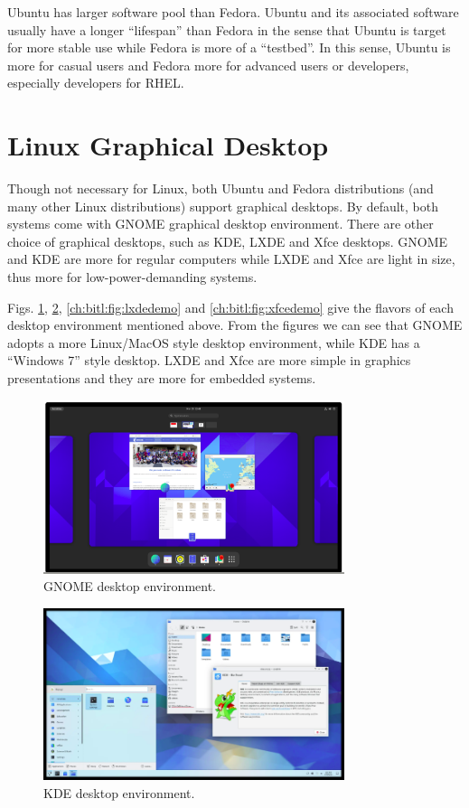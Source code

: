 Ubuntu has larger software pool than Fedora. Ubuntu and its associated software usually have a longer ``lifespan'' than Fedora in the sense that Ubuntu is target for more stable use while Fedora is more of a ``testbed''. In this sense, Ubuntu is more for casual users and Fedora more for advanced users or developers, especially developers for RHEL.

\section{Linux Graphical Desktop}

Though not necessary for Linux, both Ubuntu and Fedora distributions (and many other Linux distributions) support graphical desktops. By default, both systems come with GNOME graphical desktop environment. There are other choice of graphical desktops, such as KDE, LXDE and Xfce desktops. GNOME and KDE are more for regular computers while LXDE and Xfce are light in size, thus more for low-power-demanding systems.

Figs. \ref{ch:bitl:fig:gnomedemo}, \ref{ch:bitl:fig:kdedemo}, \ref{ch:bitl:fig:lxdedemo} and \ref{ch:bitl:fig:xfcedemo} give the flavors of each desktop environment mentioned above. From the figures we can see that GNOME adopts a more Linux/MacOS style desktop environment, while KDE has a ``Windows 7'' style desktop. LXDE and Xfce are more simple in graphics presentations and they are more for embedded systems.

\begin{figure}
	\centering
	\includegraphics[width=250pt]{chapters/ch-brief-introduction-to-linux/figures/gnome_demo.png}
	\caption{GNOME desktop environment.} \label{ch:bitl:fig:gnomedemo}
\end{figure}

\begin{figure}
	\centering
	\includegraphics[width=250pt]{chapters/ch-brief-introduction-to-linux/figures/kde_demo.png}
	\caption{KDE desktop environment.} \label{ch:bitl:fig:kdedemo}
\end{figure}

